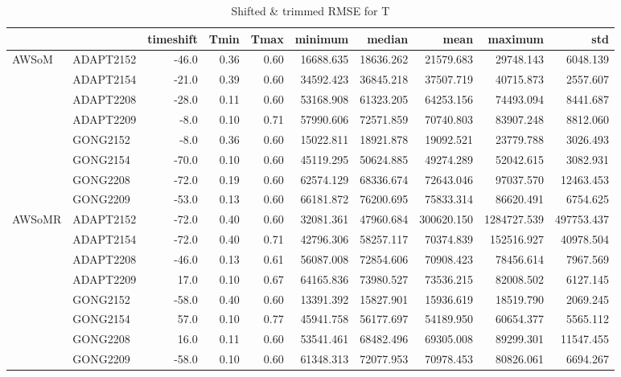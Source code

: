 \begin{table}
\centering
\caption{Shifted \& trimmed RMSE for T}
\begin{tabular}{llrrrrrrrr}
\toprule
       &          &  timeshift &  Tmin &  Tmax &    minimum &     median &        mean &      maximum &         std \\
\midrule
\multirow{8}{*}{AWSoM} & ADAPT2152 &      -46.0 &  0.36 &  0.60 &  16688.635 &  18636.262 &   21579.683 &    29748.143 &    6048.139 \\
       & ADAPT2154 &      -21.0 &  0.39 &  0.60 &  34592.423 &  36845.218 &   37507.719 &    40715.873 &    2557.607 \\
       & ADAPT2208 &      -28.0 &  0.11 &  0.60 &  53168.908 &  61323.205 &   64253.156 &    74493.094 &    8441.687 \\
       & ADAPT2209 &       -8.0 &  0.10 &  0.71 &  57990.606 &  72571.859 &   70740.803 &    83907.248 &    8812.060 \\
       & GONG2152 &       -8.0 &  0.36 &  0.60 &  15022.811 &  18921.878 &   19092.521 &    23779.788 &    3026.493 \\
       & GONG2154 &      -70.0 &  0.10 &  0.60 &  45119.295 &  50624.885 &   49274.289 &    52042.615 &    3082.931 \\
       & GONG2208 &      -72.0 &  0.19 &  0.60 &  62574.129 &  68336.674 &   72643.046 &    97037.570 &   12463.453 \\
       & GONG2209 &      -53.0 &  0.13 &  0.60 &  66181.872 &  76200.695 &   75833.314 &    86620.491 &    6754.625 \\
\cline{1-10}
\multirow{8}{*}{AWSoMR} & ADAPT2152 &      -72.0 &  0.40 &  0.60 &  32081.361 &  47960.684 &  300620.150 &  1284727.539 &  497753.437 \\
       & ADAPT2154 &      -72.0 &  0.40 &  0.71 &  42796.306 &  58257.117 &   70374.839 &   152516.927 &   40978.504 \\
       & ADAPT2208 &      -46.0 &  0.13 &  0.61 &  56087.008 &  72854.606 &   70908.423 &    78456.614 &    7967.569 \\
       & ADAPT2209 &       17.0 &  0.10 &  0.67 &  64165.836 &  73980.527 &   73536.215 &    82008.502 &    6127.145 \\
       & GONG2152 &      -58.0 &  0.40 &  0.60 &  13391.392 &  15827.901 &   15936.619 &    18519.790 &    2069.245 \\
       & GONG2154 &       57.0 &  0.10 &  0.77 &  45941.758 &  56177.697 &   54189.950 &    60654.377 &    5565.112 \\
       & GONG2208 &       16.0 &  0.11 &  0.60 &  53541.461 &  68482.496 &   69305.008 &    89299.301 &   11547.455 \\
       & GONG2209 &      -58.0 &  0.10 &  0.60 &  61348.313 &  72077.953 &   70978.453 &    80826.061 &    6694.267 \\
\bottomrule
\end{tabular}
\end{table}
